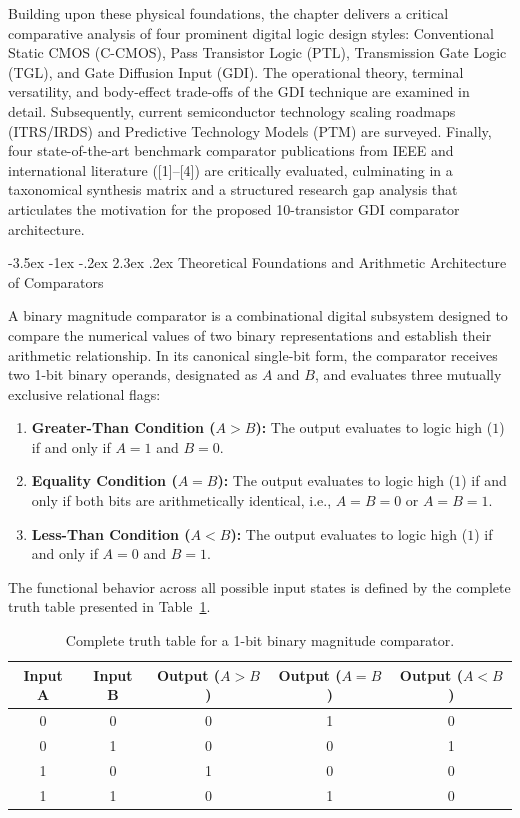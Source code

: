 \documentclass[12pt,a4paper,oneside]{report}
\makeatletter
\renewcommand\section{\@startsection {section}{1}{\z@}%
                                   {-3.5ex \@plus -1ex \@minus -.2ex}%
                                   {2.3ex \@plus.2ex}%
                                   {\normalfont\normalsize\bfseries}}
\makeatother
\begin{document}
Building upon these physical foundations, the chapter delivers a critical comparative analysis of four prominent digital logic design styles: Conventional Static CMOS (C-CMOS), Pass Transistor Logic (PTL), Transmission Gate Logic (TGL), and Gate Diffusion Input (GDI). The operational theory, terminal versatility, and body-effect trade-offs of the GDI technique are examined in detail. Subsequently, current semiconductor technology scaling roadmaps (ITRS/IRDS) and Predictive Technology Models (PTM) are surveyed. Finally, four state-of-the-art benchmark comparator publications from IEEE and international literature ([1]--[4]) are critically evaluated, culminating in a taxonomical synthesis matrix and a structured research gap analysis that articulates the motivation for the proposed 10-transistor GDI comparator architecture.

\section{Theoretical Foundations and Arithmetic Architecture of Comparators}

A binary magnitude comparator is a combinational digital subsystem designed to compare the numerical values of two binary representations and establish their arithmetic relationship. In its canonical single-bit form, the comparator receives two 1-bit binary operands, designated as $A$ and $B$, and evaluates three mutually exclusive relational flags:
\begin{enumerate}
\item \textbf{Greater-Than Condition ($A>B$):} The output evaluates to logic high ($1$) if and only if $A=1$ and $B=0$.
\item \textbf{Equality Condition ($A=B$):} The output evaluates to logic high ($1$) if and only if both bits are arithmetically identical, i.e., $A=B=0$ or $A=B=1$.
\item \textbf{Less-Than Condition ($A<B$):} The output evaluates to logic high ($1$) if and only if $A=0$ and $B=1$.
\end{enumerate}

The functional behavior across all possible input states is defined by the complete truth table presented in Table~\ref{tab:lit_truthtable}.

\begin{table}[H]
\centering
\caption{Complete truth table for a 1-bit binary magnitude comparator.}
\label{tab:lit_truthtable}
\vspace{0.2cm}
\begin{tabular}{|c|c|c|c|c|}
\hline
\textbf{Input A} & \textbf{Input B} & \textbf{Output ($A>B$)} & \textbf{Output ($A=B$)} & \textbf{Output ($A<B$)} \\
\hline
0 & 0 & 0 & 1 & 0 \\
\hline
0 & 1 & 0 & 0 & 1 \\
\hline
1 & 0 & 1 & 0 & 0 \\
\hline
1 & 1 & 0 & 1 & 0 \\
\hline
\end{tabular}
\end{table}
\end{document}

